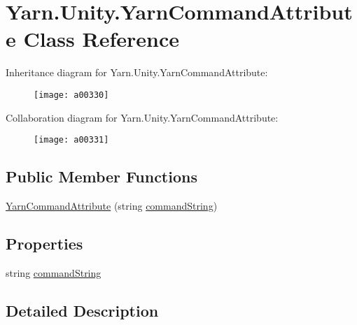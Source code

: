 \hypertarget{a00090}{\section{Yarn.\-Unity.\-Yarn\-Command\-Attribute Class Reference}
\label{a00090}
}


Inheritance diagram for Yarn.\-Unity.\-Yarn\-Command\-Attribute\-:
\nopagebreak
\begin{figure}[H]
\begin{center}
\leavevmode
\texttt{[image: a00330]}
\end{center}
\end{figure}


Collaboration diagram for Yarn.\-Unity.\-Yarn\-Command\-Attribute\-:
\nopagebreak
\begin{figure}[H]
\begin{center}
\leavevmode
\texttt{[image: a00331]}
\end{center}
\end{figure}
\subsection*{Public Member Functions}
\begin{DoxyCompactItemize}
\item 
\hyperlink{a00090_a9c0d57cd72c091f63895944959e98330}{Yarn\-Command\-Attribute} (string \hyperlink{a00090_a6d513a725c819ffcdaa9c5788472ec8d}{command\-String})
\end{DoxyCompactItemize}
\subsection*{Properties}
\begin{DoxyCompactItemize}
\item 
string \hyperlink{a00090_a6d513a725c819ffcdaa9c5788472ec8d}{command\-String}
\end{DoxyCompactItemize}


\subsection{Detailed Description}


